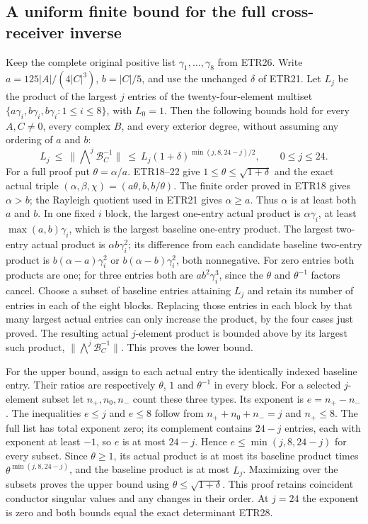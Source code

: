 \documentclass[11pt]{article}
\begin{document}
\subsection{A uniform finite bound for the full cross-receiver inverse}
Keep the complete original positive list $\gamma_1,\ldots,\gamma_8$
from ETR26. Write $a=125|A|/(4|C|^3)$, $b=|C|/5$, and use the
unchanged $\delta$ of ETR21. Let $L_j$ be the product of the largest
$j$ entries of the twenty-four-element multiset
$\{a\gamma_i,b\gamma_i,b\gamma_i:1\le i\le8\}$, with $L_0=1$.
Then the following bounds hold for every $A,C\ne0$, every complex
$B$, and every exterior degree, without assuming any ordering of
$a$ and $b$:
\[
 L_j\ \le\ \|\mathop{\bigwedge}\nolimits^j\mathcal B_C^{-1}\|
       \ \le\ L_j(1+\delta)^{\min(j,8,24-j)/2},
       \qquad 0\le j\le24.                              \tag{ETR31}
\]
For a full proof put $\theta=\alpha/a$. ETR18--22 give
$1\le\theta\le\sqrt{1+\delta}$ and the exact actual triple
$(\alpha,\beta,\chi)=(a\theta,b,b/\theta)$.
The finite order proved in ETR18 gives $\alpha>b$; the Rayleigh
quotient used in ETR21 gives $\alpha\ge a$. Thus $\alpha$ is at
least both $a$ and $b$. In one fixed $i$ block, the largest one-entry
actual product is $\alpha\gamma_i$, at least
$\max(a,b)\gamma_i$, which is the largest baseline one-entry
product. The largest two-entry actual product is $\alpha b\gamma_i^2$;
its difference from each candidate baseline two-entry product is
$b(\alpha-a)\gamma_i^2$ or $b(\alpha-b)\gamma_i^2$, both nonnegative.
For zero entries both products are one; for three entries both are
$ab^2\gamma_i^3$, since the $\theta$ and $\theta^{-1}$ factors cancel.
Choose a subset of baseline entries attaining $L_j$ and retain its
number of entries in each of the eight blocks. Replacing those entries
in each block by that many largest actual entries can only increase
the product, by the four cases just proved. The resulting actual
$j$-element product is bounded above by its largest such product,
$\|\bigwedge^j\mathcal B_C^{-1}\|$. This proves the lower bound.

For the upper bound, assign to each actual entry the identically
indexed baseline entry. Their ratios are respectively $\theta$, $1$
and $\theta^{-1}$ in every block. For a selected $j$-element subset
let $n_+,n_0,n_-$ count these three types. Its exponent is
$e=n_+-n_-$. The inequalities $e\le j$ and $e\le8$ follow from
$n_++n_0+n_-=j$ and $n_+\le8$. The full list has total exponent zero;
its complement contains $24-j$ entries, each with exponent at least
$-1$, so $e$ is at most $24-j$. Hence
$e\le\min(j,8,24-j)$ for every subset. Since $\theta\ge1$, its
actual product is at most its baseline product times
$\theta^{\min(j,8,24-j)}$, and the baseline product is at most
$L_j$. Maximizing over the subsets proves the upper bound using
$\theta\le\sqrt{1+\delta}$. This proof retains coincident conductor
singular values and any changes in their order. At $j=24$ the exponent
is zero and both bounds equal the exact determinant ETR28.
\end{document}
